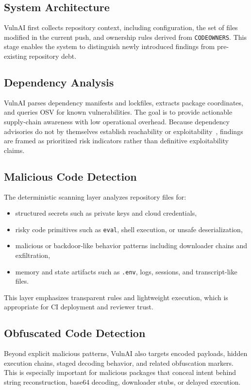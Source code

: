 \documentclass[conference]{IEEEtran}
\begin{document}
\subsection{System Architecture}
VulnAI first collects repository context, including configuration, the set of files modified in the current push, and ownership rules derived from \texttt{CODEOWNERS}. This stage enables the system to distinguish newly introduced findings from pre-existing repository debt.

\subsection{Dependency Analysis}
VulnAI parses dependency manifests and lockfiles, extracts package coordinates, and queries OSV for known vulnerabilities. The goal is to provide actionable supply-chain awareness with low operational overhead. Because dependency advisories do not by themselves establish reachability or exploitability~\cite{deng2025chainfuzz}, findings are framed as prioritized risk indicators rather than definitive exploitability claims.

\subsection{Malicious Code Detection}
The deterministic scanning layer analyzes repository files for:
\begin{itemize}
\item structured secrets such as private keys and cloud credentials,
\item risky code primitives such as \texttt{eval}, shell execution, or unsafe deserialization,
\item malicious or backdoor-like behavior patterns including downloader chains and exfiltration,
\item memory and state artifacts such as \texttt{.env}, logs, sessions, and transcript-like files.
\end{itemize}

This layer emphasizes transparent rules and lightweight execution, which is appropriate for CI deployment and reviewer trust.

\subsection{Obfuscated Code Detection}
Beyond explicit malicious patterns, VulnAI also targets encoded payloads, hidden execution chains, staged decoding behavior, and related obfuscation markers. This is especially important for malicious packages that conceal intent behind string reconstruction, base64 decoding, downloader stubs, or delayed execution.
\end{document}
